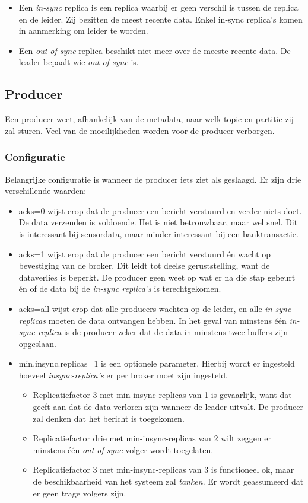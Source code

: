 \documentclass[a4paper,10pt,twoside]{report}
\begin{document}
\begin{itemize}
	\item Een \textit{in-sync} replica is een replica waarbij er geen verschil is tussen de replica en de leider. Zij bezitten de meest recente data. Enkel in-sync replica's komen in aanmerking om leider te worden.
	\item Een \textit{out-of-sync} replica beschikt niet meer over de meeste recente data. De leader bepaalt wie \textit{out-of-sync} is.
\end{itemize}

\subsection{Producer}
Een producer weet, afhankelijk van de metadata, naar welk topic en partitie zij zal sturen. Veel van de moeilijkheden worden voor de producer verborgen. 

\subsubsection{Configuratie}
Belangrijke configuratie is wanneer de producer iets ziet als geslaagd. Er zijn drie verschillende waarden:

\begin{itemize}
	\item acks=0 wijst erop dat de producer een bericht verstuurd en verder niets doet. De data verzenden is voldoende. Het is niet betrouwbaar, maar wel snel. Dit is interessant bij sensordata, maar minder interessant bij een banktransactie.
	\item acks=1 wijst erop dat de producer een bericht verstuurd én wacht op bevestiging van de broker. Dit leidt tot deelse geruststelling, want de dataverlies is beperkt. De producer geen weet op wat er na die stap gebeurt én of de data bij de \textit{in-sync replica's} is terechtgekomen.
	\item acks=all wijst erop dat alle producers wachten op de leider, en alle \textit{in-sync replicas} moeten de data ontvangen hebben. In het geval van minstens één \textit{in-sync replica} is de producer zeker dat de data in minstens twee buffers zijn opgeslaan. 
	\item min.insync.replicas=1 is een optionele parameter. Hierbij wordt er ingesteld hoeveel \textit{insync-replica's} er per broker moet zijn ingesteld.
	\begin{itemize}
		\item Replicatiefactor 3 met min-insync-replicas van 1 is gevaarlijk, want dat geeft aan dat de data verloren zijn wanneer de leader uitvalt. De producer zal denken dat het bericht is toegekomen.
		\item Replicatiefactor drie met min-insync-replicas van 2 wilt zeggen er minstens één \textit{out-of-sync} volger wordt toegelaten.
		\item Replicatiefactor 3 met min-insync-replicas van 3 is functioneel ok, maar de beschikbaarheid van het systeem zal \textit{tanken}. Er wordt geassumeerd dat er geen trage volgers zijn.
	\end{itemize}
\end{itemize}
\end{document}
